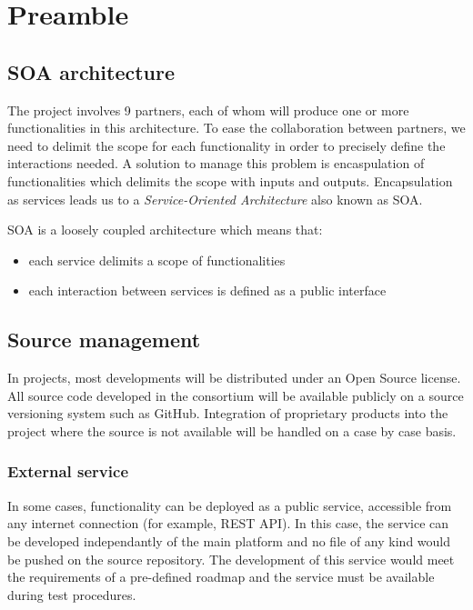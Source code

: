 \chapter{Preamble}
\label{ch:preamble}

\section{SOA architecture}
\label{sec:soa-architecture}

The \learnpad project involves 9 partners, each of whom will produce one or more functionalities
in this architecture. To ease the collaboration between partners, we need to delimit the scope
for each functionality in order to precisely define the interactions needed. A solution to manage
this problem is encaspulation of functionalities which delimits the scope with inputs and outputs.
Encapsulation as services leads us to a \emph{Service-Oriented Architecture} also known as SOA.

SOA is a loosely coupled architecture which means that:
\begin{itemize}
	\item each service delimits a scope of functionalities
	\item each interaction between services is defined as a public interface
\end{itemize}

\section{Source management}
\label{sec:source-management}

In \learnpad projects, most developments will be distributed under an Open Source license.
All source code developed in the consortium will be available publicly on a source versioning
system such as GitHub. Integration of proprietary products into the project where the source
is not available will be handled on a case by case basis.

\subsection{External service}
\label{sec:external-service}

In some cases, functionality can be deployed as a public service, accessible from any internet
connection (for example, REST API). In this case, the service can be developed independantly of
the main \learnpad platform and no file of any kind would be pushed on the source repository.
The development of this service would meet the requirements of a pre-defined roadmap and the
service must be available during test procedures.

